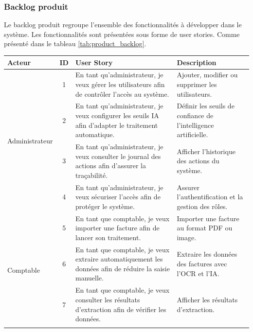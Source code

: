\FloatBarrier

\subsubsection{Backlog produit}

Le backlog produit regroupe l’ensemble des fonctionnalités à développer dans le système.
Les fonctionnalités sont présentées sous forme de user stories.
Comme présenté dans le tableau \ref{tab:product_backlog}.
\begin{table}[H]
\centering
\small
\renewcommand{\arraystretch}{1.35}
\setlength{\tabcolsep}{4pt}

\begin{tabularx}{\textwidth}{|p{3cm}|c|X|X|}
\hline
\rowcolor{blue!20}
\textbf{Acteur} & \textbf{ID} & \textbf{User Story} & \textbf{Description} \\
\hline

\multirow{4}{3cm}{Administrateur}
& 1 & En tant qu’administrateur, je veux gérer les utilisateurs afin de contrôler l’accès au système. 
& Ajouter, modifier ou supprimer les utilisateurs. \\ \cline{2-4}

& 2 & En tant qu’administrateur, je veux configurer les seuils IA afin d’adapter le traitement automatique. 
& Définir les seuils de confiance de l’intelligence artificielle. \\ \cline{2-4}

& 3 & En tant qu’administrateur, je veux consulter le journal des actions afin d’assurer la traçabilité. 
& Afficher l’historique des actions du système. \\ \cline{2-4}

& 4 & En tant qu’administrateur, je veux sécuriser l’accès afin de protéger le système. 
& Assurer l’authentification et la gestion des rôles. \\
\hline

\multirow{5}{3cm}{Comptable}
& 5 & En tant que comptable, je veux importer une facture afin de lancer son traitement. 
& Importer une facture au format PDF ou image. \\ \cline{2-4}

& 6 & En tant que comptable, je veux extraire automatiquement les données afin de réduire la saisie manuelle. 
& Extraire les données des factures avec l’OCR et l’IA. \\ \cline{2-4}

& 7 & En tant que comptable, je veux consulter les résultats d’extraction afin de vérifier les données. 
& Afficher les résultats d’extraction. \\ \cline{2-4}


\end{tabularx}
\end{table}
